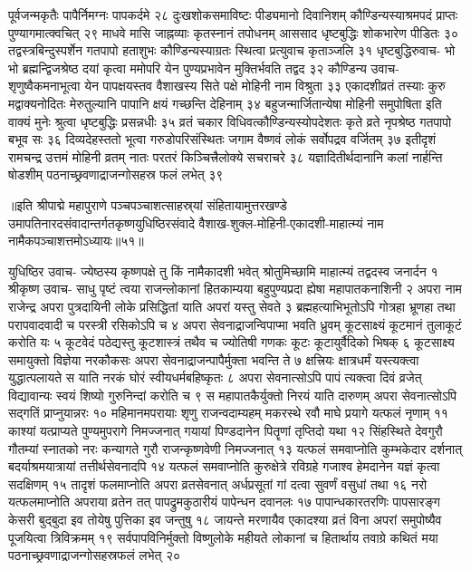 पूर्वजन्मकृतैः पापैर्निमग्नः पापकर्दमे २८
दुःखशोकसमाविष्टः पीड्यमानो दिवानिशम् 
कौण्डिन्यस्याश्रमपदं प्राप्तः पुण्यागमात्क्वचित् २९
माधवे मासि जाह्नव्याः कृतस्नानं तपोधनम् 
आससाद धृष्टबुद्धिः शोकभारेण पीडितः ३०
तद्वस्त्रबिन्दुस्पर्शेन गतपापो हताशुभः 
कौण्डिन्यस्याग्रतः स्थित्वा प्रत्युवाच कृताञ्जलि ३१
धृष्टबुद्धिरुवाच-
भो भो ब्रह्मन्द्विजश्रेष्ठ दयां कृत्वा ममोपरि 
येन पुण्यप्रभावेन मुक्तिर्भवति तद्वद ३२
कौण्डिन्य उवाच-
शृणुष्वैकमनाभूत्वा येन पापक्षयस्तव 
वैशाखस्य सिते पक्षे मोहिनी नाम विश्रुता ३३
एकादशीव्रतं तस्याः कुरु मद्वाक्यनोदितः 
मेरुतुल्यानि पापानि क्षयं गच्छन्ति देहिनाम् ३४
बहुजन्मार्जितान्येषा मोहिनी समुपोषिता 
इति वाक्यं मुनेः श्रुत्वा धृष्टबुद्धिः प्रसन्नधीः ३५
व्रतं चकार विधिवत्कौण्डिन्यस्योपदेशतः 
कृते व्रते नृपश्रेष्ठ गतपापो बभूव सः ३६
दिव्यदेहस्ततो भूत्वा गरुडोपरिसंस्थितः 
जगाम वैष्णवं लोकं सर्वोपद्रव वर्जितम् ३७
इतीदृशं रामचन्द्र उत्तमं मोहिनी व्रतम् 
नातः परतरं किञ्चित्त्रैलोक्ये सचराचरे ३८
यज्ञादितीर्थदानानि कलां नार्हन्ति षोडशीम् 
पठनाच्छ्रवणाद्राजन्गोसहस्र फलं लभेत् ३९

॥इति श्रीपाद्मे महापुराणे पञ्चपञ्चाशत्साहस्र्यां संहितायामुत्तरखण्डे उमापतिनारदसंवादान्तर्गतकृष्णयुधिष्ठिरसंवादे वैशाख-शुक्ल-मोहिनी-एकादशी-माहात्म्यं नाम नामैकपञ्चाशत्तमोऽध्यायः॥५१॥



युधिष्ठिर उवाच-
ज्येष्ठस्य कृष्णपक्षे तु किं नामैकादशी भवेत् 	
श्रोतुमिच्छामि माहात्म्यं तद्वदस्व जनार्दन १
श्रीकृष्ण उवाच-
साधु पृष्टं त्वया राजन्लोकानां हितकाम्यया 
बहुपुण्यप्रदा ह्येषा महापातकनाशिनी २
अपरा नाम राजेन्द्र अपरा पुत्रदायिनी 
लोके प्रसिद्धितां याति अपरां यस्तु सेवते ३
ब्रह्महत्याभिभूतोऽपि गोत्रहा भ्रूणहा तथा 
परापवादवादी च परस्त्री रसिकोऽपि च ४
अपरा सेवनाद्राजन्विपाप्मा भवति ध्रुवम् 
कूटसाक्ष्यं कूटमानं तुलाकूटं करोति यः ५
कूटवेदं पठेद्यस्तु कूटशास्त्रं तथैव च 
ज्योतिषी गणकः कूटः कूटायुर्वैदिको भिषक् ६
कूटसाक्ष्य समायुक्तो विज्ञेया नरकौकसः 
अपरा सेवनाद्राजन्पापैर्मुक्ता भवन्ति ते ७
क्षत्त्रियः क्षात्रधर्मं यस्त्यक्त्वा युद्धात्पलायते 
स याति नरकं घोरं स्वीयधर्मबहिष्कृतः ८
अपरा सेवनात्सोऽपि पापं त्यक्त्वा दिवं व्रजेत् 
विद्यावान्यः स्वयं शिष्यो गुरुनिन्दां करोति च ९
स महापातकैर्युक्तो निरयं याति दारुणम् 
अपरा सेवनात्सोऽपि सद्गतिं प्राप्नुयान्नरः १०
महिमानमपरायाः शृणु राजन्वदाम्यहम् 
मकरस्थे रवौ माघे प्रयागे यत्फलं नृणाम् ११
काश्यां यत्प्राप्यते पुण्यमुपरागे निमज्जनात् 
गयायां पिण्डदानेन पितॄणां तृप्तिदो यथा १२
सिंहस्थिते देवगुरौ गौतम्यां स्नातको नरः 
कन्यागते गुरौ राजन्कृष्णवेणी निमज्जनात् १३
यत्फलं समवाप्नोति कुम्भकेदार दर्शनात् 
बदर्याश्रमयात्रायां तत्तीर्थसेवनादपि १४
यत्फलं समवाप्नोति कुरुक्षेत्रे रविग्रहे 
गजाश्व हेमदानेन यज्ञं कृत्वा सदक्षिणम् १५
तादृशं फलमाप्नोति अपरा व्रतसेवनात् 
अर्धप्रसूतां गां दत्वा सुवर्णं वसुधां तथा १६
नरो यत्फलमाप्नोति अपराया व्रतेन तत् 
पापद्रुमकुठारीयं पापेन्धन दवानलः १७
पापान्धकारतरणिः पापसारङ्ग केसरी 
बुद्बुदा इव तोयेषु पुत्तिका इव जन्तुषु १८
जायन्ते मरणायैव एकादश्या व्रतं विना 
अपरां समुपोष्यैव पूजयित्वा त्रिविक्रमम् १९
सर्वपापविनिर्मुक्तो विष्णुलोके महीयते 
लोकानां च हितार्थाय तवाग्रे कथितं मया 
पठनाच्छ्रवणाद्राजन्गोसहस्रफलं लभेत् २०

